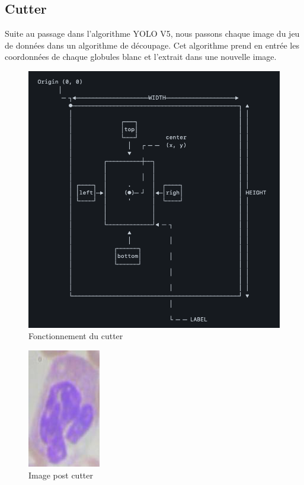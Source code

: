 \subsection{Cutter}
Suite au passage dans l'algorithme YOLO V5, nous passons chaque image du jeu de données dans un algorithme de découpage. Cet algorithme prend en entrée les coordonnées de chaque globules blanc et l'extrait dans une nouvelle image. 
\begin{figure}[!h]
    \centering
    \includegraphics[scale=0.4]{images/cutter.png}
    \caption{Fonctionnement du cutter}
    \label{fig:cutter}
\end{figure}

\begin{figure}[!h]
    \centering
    \includegraphics[scale=0.5]{images/postcut.jpeg}
    \caption{Image post cutter}
    \label{fig:postcutter}
\end{figure}

